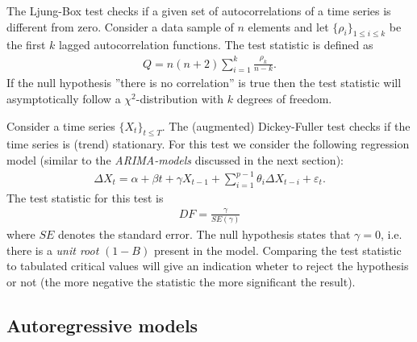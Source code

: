     \begin{method}
        The Ljung-Box test checks if a given set of autocorrelations of a time series is different from zero. Consider a data sample of $n$ elements and let $\{\rho_i\}_{1\leq i\leq k}$ be the first $k$ lagged autocorrelation functions. The test statistic is defined as
        \begin{gather}
            Q = n(n+2)\sum_{i=1}^k\frac{\rho_k}{n-k}.
        \end{gather}
        If the null hypothesis ''there is no correlation'' is true then the test statistic will asymptotically follow a $\chi^2$-distribution with $k$ degrees of freedom.
    \end{method}

    \begin{method}
        Consider a time series $\{X_t\}_{t\leq T}$. The (augmented) Dickey-Fuller test checks if the time series is (trend) stationary. For this test we consider the following regression model (similar to the \textit{ARIMA-models} discussed in the next section):
        \begin{gather}
            \Delta X_t = \alpha + \beta t + \gamma X_{t-1} + \sum_{i=1}^{p-1} \theta_i\Delta X_{t-i} + \varepsilon_t.
        \end{gather}
        The test statistic for this test is
        \begin{gather}
            DF = \frac{\gamma}{SE(\gamma)}
        \end{gather}
        where $SE$ denotes the standard error. The null hypothesis states that $\gamma=0$, i.e. there is a \textit{unit root} $(1-B)$ present in the model. Comparing the test statistic to tabulated critical values will give an indication wheter to reject the hypothesis or not (the more negative the statistic the more significant the result).
    \end{method}

\subsection{Autoregressive models}


